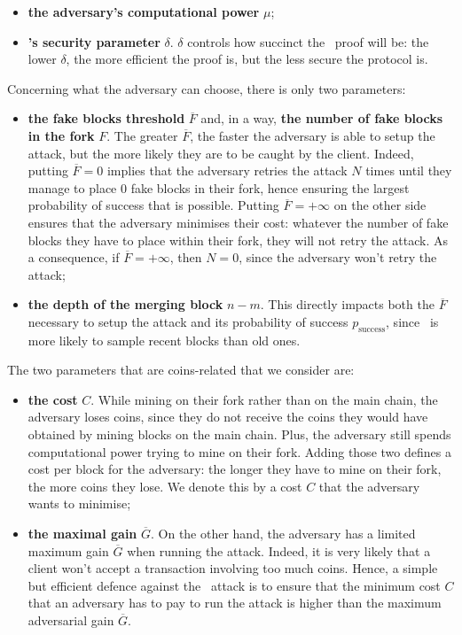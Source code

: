\begin{itemize}
    \item \textbf{the adversary's computational power} \(\mu\);
    \item \textbf{\FC's security parameter} \(\delta\). \(\delta\) controls how succinct the \FC\ proof will be: the lower \(\delta\), the more efficient the proof is, but the less secure the protocol is.
\end{itemize}

Concerning what the adversary can choose, there is only two parameters:

\begin{itemize}
    \item \textbf{the fake blocks threshold} \(\overline{F}\) and, in a way, \textbf{the number of fake blocks in the fork} \(F\). The greater \(\overline{F}\), the faster the adversary is able to setup the attack, but the more likely they are to be caught by the client. Indeed, putting \(\overline{F}=0\) implies that the adversary retries the attack \(N\) times until they manage to place 0 fake blocks in their fork, hence ensuring the largest probability of success that is possible. Putting \(\overline{F}=+\infty\) on the other side ensures that the adversary minimises their cost: whatever the number of fake blocks they have to place within their fork, they will not retry the attack. As a consequence, if \(\overline{F}=+\infty\), then \(N=0\), since the adversary won't retry the attack;
    \item \textbf{the depth of the merging block} \(n-m\). This directly impacts both the \(\overline{F}\) necessary to setup the attack and its probability of success \(p_{\text{success}}\), since \FC\ is more likely to sample recent blocks than old ones.
\end{itemize}

The two parameters that are coins-related that we consider are:

\begin{itemize}
    \item \textbf{the cost} \(C\). While mining on their fork rather than on the main chain, the adversary loses coins, since they do not receive the coins they would have obtained by mining blocks on the main chain. Plus, the adversary still spends computational power trying to mine on their fork. Adding those two defines a cost per block for the adversary: the longer they have to mine on their fork, the more coins they lose. We denote this by a cost \(C\) that the adversary wants to minimise;
    \item \textbf{the maximal gain} \(\overline{G}\). On the other hand, the adversary has a limited maximum gain \(\overline{G}\) when running the attack. Indeed, it is very likely that a client won't accept a transaction involving too much coins. Hence, a simple but efficient defence against the \cs\ attack is to ensure that the minimum cost \(C\) that an adversary has to pay to run the attack is higher than the maximum adversarial gain \(\overline{G}\).
\end{itemize}

